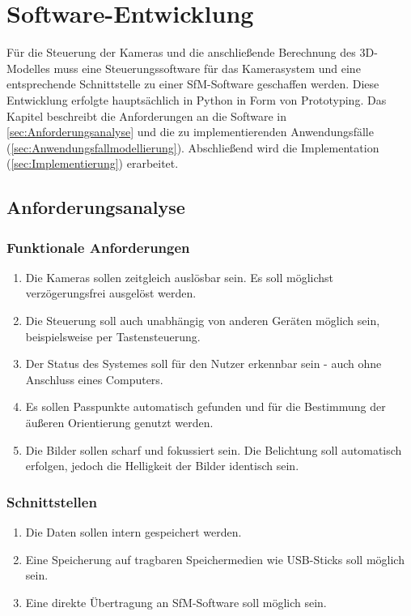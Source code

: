 \documentclass[./00PhotoBox.tex]{subfiles}
\begin{document}
\chapter{Software-Entwicklung}
Für die Steuerung der Kameras und die anschließende Berechnung des 3D-Modelles muss eine Steuerungssoftware für das Kamerasystem und eine entsprechende Schnittstelle zu einer \gls{SfM}-Software geschaffen werden. Diese Entwicklung erfolgte hauptsächlich in Python in Form von Prototyping. Das Kapitel beschreibt die Anforderungen an die Software in \autoref{sec:Anforderungsanalyse} und die zu implementierenden Anwendungsfälle (\autoref{sec:Anwendungsfallmodellierung}). Abschließend wird die Implementation (\autoref{sec:Implementierung}) erarbeitet.

\section{Anforderungsanalyse}
\label{sec:Anforderungsanalyse}

\subsection{Funktionale Anforderungen}
\begin{enumerate}[label=F\arabic*]
  \item Die Kameras sollen zeitgleich auslösbar sein. Es soll möglichst ver\-zögerungs\-frei ausgelöst werden.
  \item Die Steuerung soll auch unabhängig von anderen Geräten möglich sein, beispielsweise per Tastensteuerung.
  \item Der Status des Systemes soll für den Nutzer erkennbar sein - auch ohne Anschluss eines Computers.
  \item Es sollen Passpunkte automatisch gefunden und für die Bestimmung der äußeren Orientierung genutzt werden.
  \item Die Bilder sollen scharf und fokussiert sein. Die Belichtung soll automatisch erfolgen, jedoch die Helligkeit der Bilder identisch sein.
\end{enumerate}

\subsection{Schnittstellen}
\begin{enumerate}[label=S\arabic*]
  \item Die Daten sollen intern gespeichert werden.
  \item Eine Speicherung auf tragbaren Speichermedien wie USB-Sticks soll möglich sein.
  \item Eine direkte Übertragung an \gls{SfM}-Software soll möglich sein.
\end{enumerate}
\end{document}
